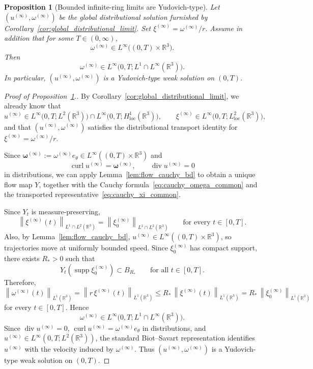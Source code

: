\documentclass[reqno,11pt]{amsart}
\newtheorem{proposition}[theorem]{Proposition}
\begin{document}
\begin{proposition}[Bounded infinite-ring limits are Yudovich-type]
\label{prop:bounded_limit_upgrade}
Let \((u^{(\infty)},\omega^{(\infty)})\) be the global distributional solution furnished by Corollary~\ref{cor:global_distributional_limit}.
 Set
$
\xi^{(\infty)}=\omega^{(\infty)}/r.$
Assume in addition that for some \(T\in(0,\infty)\),
\[
\omega^{(\infty)}\in L^\infty\bigl((0,T)\times \mathbb R^3\bigr).
\]
Then
\[
\omega^{(\infty)}\in L^\infty\bigl(0,T;L^1\cap L^\infty(\mathbb R^3)\bigr).
\]
In particular, \((u^{(\infty)},\omega^{(\infty)})\) is a Yudovich-type weak solution on \((0,T)\).
\end{proposition}

\begin{proof}[Proof of Proposition~\ref{prop:bounded_limit_upgrade}.]
By Corollary~\ref{cor:global_distributional_limit}, we already know that
\[
u^{(\infty)}\in L^\infty\bigl(0,T;L^2(\mathbb R^3)\bigr)
\cap L^\infty\bigl(0,T;H^1_{\mathrm{loc}}(\mathbb R^3)\bigr),
\qquad
\xi^{(\infty)}\in L^\infty\bigl(0,T;L^2_{\mathrm{loc}}(\mathbb R^3)\bigr),
\]
and that \((u^{(\infty)},\omega^{(\infty)})\) satisfies the distributional transport identity for \(\xi^{(\infty)}=\omega^{(\infty)}/r\).


Since \(\boldsymbol{\omega}^{(\infty)}:=\omega^{(\infty)} e_\theta\in L^\infty((0,T)\times\mathbb R^3)\) and
\[
\operatorname{curl}u^{(\infty)}=\boldsymbol{\omega}^{(\infty)},
\qquad
\operatorname{div}u^{(\infty)}=0
\]
in distributions, we can apply Lemma~\ref{lem:flow_cauchy_bd} to obtain a unique flow
map \(Y\), together with the Cauchy formula~\eqref{eq:cauchy_omega_common} and the
transported representative~\eqref{eq:cauchy_xi_common}.

Since \(Y_t\) is measure-preserving,
\[
\left\|\xi^{(\infty)}(t)\right\|_{L^1\cap L^2(\mathbb R^3)}
=
\left\|\xi_0^{(\infty)}\right\|_{L^1\cap L^2(\mathbb R^3)}
\qquad\text{for every }t\in[0,T].
\]
Also, by Lemma~\ref{lem:flow_cauchy_bd}, \(u^{(\infty)}\in L^\infty((0,T)\times\mathbb R^3)\), so
trajectories move at uniformly bounded speed. Since \(\xi_0^{(\infty)}\) has compact support, there
exists \(R_*>0\) such that
\[
Y_t\left(\operatorname{supp}\xi_0^{(\infty)}\right)\subset B_{R_*}
\qquad\text{for all }t\in[0,T].
\]
Therefore,
\[
\left\|\omega^{(\infty)}(t)\right\|_{L^1(\mathbb R^3)}
=
\left\|r\,\xi^{(\infty)}(t)\right\|_{L^1(\mathbb R^3)}
\le
R_*\,\left\|\xi^{(\infty)}(t)\right\|_{L^1(\mathbb R^3)}
=
R_*\,\left\|\xi_0^{(\infty)}\right\|_{L^1(\mathbb R^3)}
\]
for every \(t\in[0,T]\). Hence
\[
\omega^{(\infty)}\in L^\infty\bigl(0,T;L^1\cap L^\infty(\mathbb R^3)\bigr).
\]
Since \(\operatorname{div}u^{(\infty)}=0\), \(\operatorname{curl}u^{(\infty)}=\omega^{(\infty)} e_\theta\) in distributions, and
\(u^{(\infty)}\in L^\infty(0,T;L^2(\mathbb R^3))\), the standard Biot--Savart representation identifies
\(u^{(\infty)}\) with the velocity induced by \(\omega^{(\infty)}\). Thus \((u^{(\infty)},\omega^{(\infty)})\) is a Yudovich-type weak
solution on \((0,T)\).
\end{proof}
\end{document}

